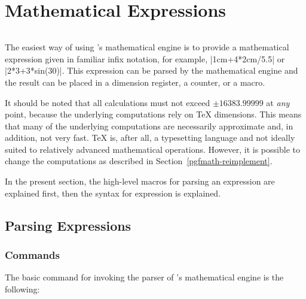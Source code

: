 %
%
%


\section[math-parsing]{Mathematical Expressions}
\label{pgfmath-syntax}

\begin{warpMathJax}
    \( \newcommand{\mvar}[1]{#1} \)
\end{warpMathJax}

The easiest way of using \pgfname's mathematical engine is to provide a
mathematical expression given in familiar infix notation, for example,
|1cm+4*2cm/5.5| or |2*3+3*sin(30)|. This expression can be parsed by the
mathematical engine and the result can be placed in a dimension register, a
counter, or a macro.

It should be noted that all calculations must not exceed $\pm16383.99999$ at
\emph{any} point, because the underlying computations rely on \TeX{}
dimensions. This means that many of the underlying computations are necessarily
approximate and, in addition, not very fast. \TeX{} is, after all, a
typesetting language and not ideally suited to relatively advanced mathematical
operations. However, it is possible to change the computations as described in
Section~\ref{pgfmath-reimplement}.

In the present section, the high-level macros for parsing an expression are
explained first, then the syntax for expression is explained.


\subsection{Parsing Expressions}
\label{pgfmath-registers}
\label{pgfmath-parsing}

\subsubsection{Commands}

The basic command for invoking the parser of \pgfname's
mathematical engine is the following:

